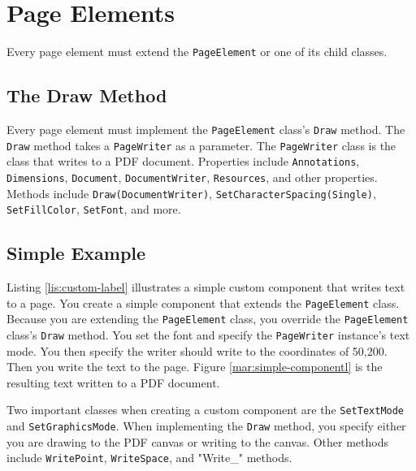 \documentclass[american]{tufte-book}
\numberwithin{equation}{section}
\numberwithin{figure}{section}
\begin{document}
{{\section{Page Elements}
Every page element must extend the \texttt{PageElement} or one of its child classes.
\subsection{The Draw Method}
Every page element must implement the \texttt{PageElement} class's \texttt{Draw} method. The \texttt{Draw} method takes a \texttt{PageWriter} as a parameter. The \texttt{PageWriter} class is the class that writes to a PDF document. Properties include \texttt{Annotations}, \texttt{Dimensions}, \texttt{Document}, \texttt{DocumentWriter}, \texttt{Resources}, and other properties. 
Methods include \texttt{Draw(DocumentWriter)}, \texttt{SetCharacterSpacing(Single)}, \texttt{SetFillColor}, \texttt{SetFont}, and more.
\subsection{Simple Example}
Listing \ref{lis:custom-label} illustrates a simple custom component that writes text to a page. You create a simple component that extends the \texttt{PageElement} class. Because you are extending the \texttt{PageElement} class, you override the \texttt{PageElement} class's \texttt{Draw} method. You set the font and specify the \texttt{PageWriter} instance's text mode. You then specify the writer should write to the coordinates of 50,200. Then you write the text to the page.  Figure \ref{mar:simple-componentl} is the resulting text written to a PDF document.

Two important classes when creating a custom component are the \texttt{SetTextMode} and \texttt{SetGraphicsMode}. When implementing the \texttt{Draw} method, you specify either you are drawing to the PDF canvas or writing to the canvas. Other methods include \texttt{WritePoint}, \texttt{WriteSpace}, and "Write\_" methods.  

}}
\end{document}
